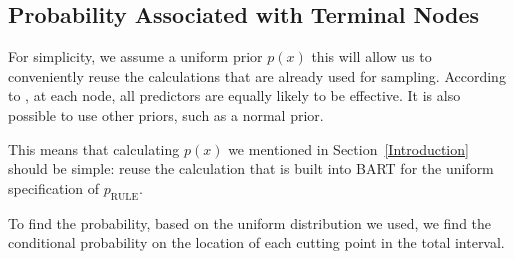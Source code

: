 \subsection{Probability Associated with Terminal Nodes}
\label{p}

For simplicity, we assume a uniform prior $p(x)$ this will allow us to conveniently reuse the calculations that are already used for sampling. According to \cite{BART}, at each node, all predictors are equally likely to be effective. It is also possible to use other priors, such as a normal prior.

This means that calculating $p(x)$ we mentioned in Section~\ref{Introduction} should
be simple: reuse the calculation that is built into BART for the uniform specification of $p_{\mbox{RULE}}$.

To find the probability, based on the uniform distribution we used, we find the conditional probability on the location of each cutting point in the total interval.

